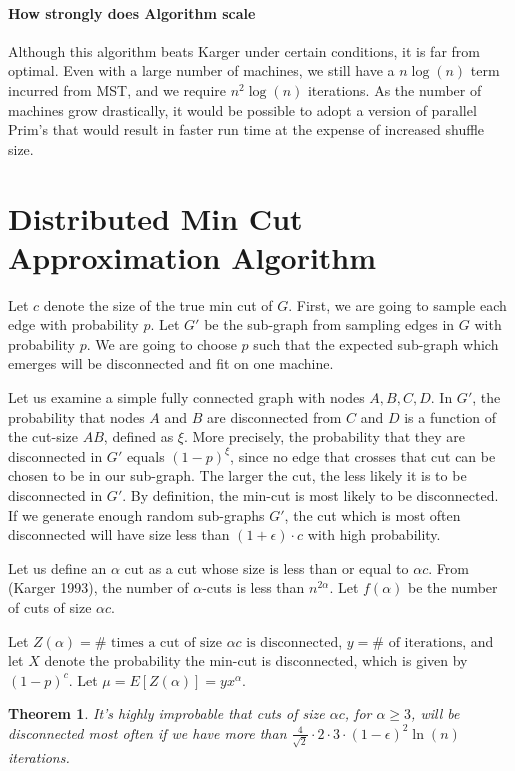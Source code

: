 \documentclass[12pt]{article}
\newtheorem{theorem}{Theorem}
\begin{document}
\paragraph{How strongly does Algorithm scale} Although this algorithm beats Karger under certain conditions, it is far from optimal. Even with a large number of machines, we still have a $n\log(n)$ term incurred from MST, and we require $n^2 \log(n)$ iterations. As the number of machines grow drastically, it would be possible to adopt a version of parallel Prim's that would result in faster run time at the expense of increased shuffle size.

\section{Distributed Min Cut Approximation Algorithm}

Let $c$ denote the size of the true min cut of $G$. First, we are going to sample each edge with probability $p$. Let $G'$ be the sub-graph from sampling edges in $G$ with probability $p$. We are going to choose $p$ such that the expected sub-graph which emerges will be disconnected and fit on one machine. 

Let us examine a simple fully connected graph with nodes $A, B, C, D$.  In $G'$, the probability that nodes $A$ and $B$ are disconnected from $C$ and $D$ is a function of the cut-size $AB$, defined as $\xi$. More precisely, the probability that they are disconnected in $G'$ equals $(1-p)^\xi$, since no edge that crosses that cut can be chosen to be in our sub-graph. The larger the cut, the less likely it is to be disconnected in $G'$. By definition, the min-cut is most likely to be disconnected. If we generate enough random sub-graphs $G'$, the cut which is most often disconnected will have size less than $(1+\epsilon) \cdot c$ with high probability.

Let us define an $\alpha$ cut as a cut whose size is less than or equal to $\alpha c$. From (Karger 1993), the number of $\alpha$-cuts is less than $n^{2 \alpha}$. Let $f(\alpha)$ be the number of cuts of size $\alpha c$.

Let $Z(\alpha) = \# \text{ times a cut of size } \alpha c \text{ is disconnected}$, $y = \# \text{ of iterations}$, and let $X$ denote the probability the min-cut is disconnected, which is given by $(1 - p)^c$. Let $\mu = E[Z(\alpha)] = yx^\alpha$.

\begin{theorem} It's highly improbable that cuts of size $\alpha c$, for $\alpha \geq 3$, will be disconnected most often if we have more than $\frac{4}{\sqrt{2}} \cdot 2 \cdot 3 \cdot (1-\epsilon)^2 \ln{(n)}$ iterations.
\end{theorem}
\end{document}
